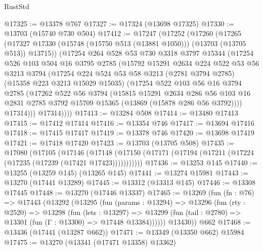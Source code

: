\begin{lexlean}{RustStd}
\begin{coremodule}
@17325 := @13378 @767
@17327 := @17324 (@13698 @17325)
@17330 := @13703 (@15740 @730 @504)
@17412 := @17247
    (@17252
      (@17260
        (@17265 (@17327 @17330 (@15748 (@15750 @513 (@13881 @1050))) (@13703 (@13705 @513)) @13715))
        (@17254
          @264
          @528
          @53
          @730
          @3318
          @3797
          @15344
          (@17254
            @526
            @103
            @504
            @16
            @3795
            @2785
            (@15792
              @15291
              @2634
              @224
              @522
              @53
              @56
              @3213
              @3794
              (@17254
                @224
                @524
                @53
                @58
                @3213
                (@2781 @3794 @2785)
                (@15358 @223 @3213 @15029 @15035)
                (@17254
                  @522
                  @103
                  @56
                  @16
                  @3794
                  @2785
                  (@17262
                    @522
                    @56
                    @3794
                    (@15815
                      @15291
                      @2634
                      @286
                      @56
                      @103
                      @16
                      @2831
                      @2785
                      @3792
                      @15709
                      @15365
                      (@13869 (@15878 @286 @56 @3792))))
                  @17314)))
            @17314))))
@17413 := @13284 @508
@17414 := @13480 @17413
@17415 := @17412 @17414
@17416 := @13354 @746
@17417 := @13694 @17416
@17418 := @17415 @17417
@17419 := @13378 @746
@17420 := @13698 @17419
@17421 := @17418 @17420
@17423 := @13703 (@13705 @508)
@17435 := @17080
    (@17105
      (@17146
        (@17148 (@17150 (@17171 (@17194 (@17211 (@17224 (@17235 (@17239 (@17421 @17423)))))))))))
@17436 := @13253 @145
@17440 := @13255 (@13259 @145) (@13265 @145)
@17441 := @13274 @15981
@17443 := @13270 (@17441 @13289)
@17445 := @13312 (@13313 @145)
@17446 := @13308 @17445
@17448 := @13270 (@17446 @13337)
@17465 := @13269
    (fun (fn : @76) =>
    @17443
      (@13292
        (@13295
          (fun (params : @13294) =>
          @13296
            (fun (rty : @2520) =>
            @13298
              (fun (lets : @13297) =>
              @13299 (fun (tail : @2780) => @13301 (fun (Γ : @13300) => @17448 @13384))))))
        @13430))
    @662
@17468 := @13436 (@17441 (@13287 @662))
@17471 := @13349 (@13350 @662) @15984
@17475 := @13270 (@13341 (@17471 @13358) @13362)

\end{coremodule}
\end{lexlean}
